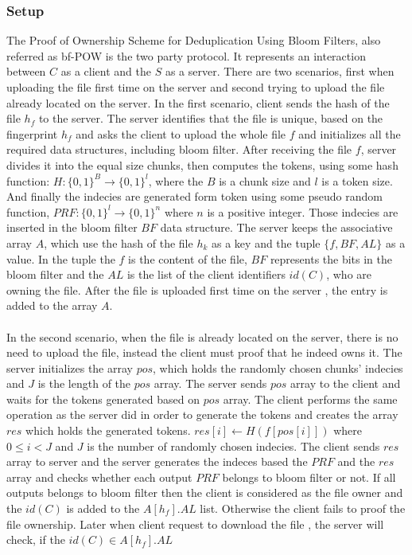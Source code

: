 \documentclass[12pt]{article}
\begin{document}
\subsubsection{Setup}
\label{subsub:setup6}
The Proof of Ownership Scheme for Deduplication Using Bloom Filters, also referred as bf-POW is the two party protocol. It represents an interaction between $C$ as a client and the $S$ as a server. There are two scenarios, first when uploading the file first time on the server and second trying to upload the file already located on the server. In the first scenario, client  sends the hash of the file  $h_f$  to the server. The server identifies that the file is unique, based on the fingerprint $h_f$ and asks the client to upload the whole file $f$ and initializes all the required data structures, including bloom filter. After receiving the file $f$, server divides it into the equal size chunks, then computes the tokens, using some hash function: $H:\{0,1\}^B\to\{0,1\}^l$, where the $B$ is a chunk size and $l$ is a token size. And finally the indecies are generated form token using some pseudo random function, $PRF: \{0,1\}^l \to \{0,1\}^{n}$ where $n$ is a positive  integer. Those indecies are inserted in the bloom filter $BF$ data structure. The server keeps the associative array $A$, which use the hash of the file $h_k$ as a key and the tuple $\{f,BF,AL\}$ as a value. In the tuple the $f$ is the content of the file, $BF$ represents the bits in the bloom filter and the $AL$ is the list of the client identifiers $id(C)$, who are owning the file. After the file is uploaded first time on the server , the entry is added to the array $A$.\\\\
In the second scenario, when the file is already located on the server, there is no need to upload the file, instead the client must proof that he indeed owns it. The server initializes the array $pos$, which holds the randomly chosen chunks' indecies and $J$ is the length of the $pos$ array. The server sends $pos$ array to the client and waits for the tokens generated based on $pos$ array. The client performs the same operation as the server did in order to generate the tokens and creates the array $res$ which holds the generated tokens.  $res[i]\gets H(f[pos[i]])$ where $ 0 \leq i < J$ and $J$ is the number of randomly chosen indecies. The client sends $res$ array to server and the server generates the indeces based the $PRF$ and the  $res$ array and checks whether each output $PRF$ belongs to bloom filter or not. If all outputs belongs to bloom filter then the client is considered as the file owner and the $id(C)$ is added to the $A[h_f].AL$ list. Otherwise the client fails to proof the file ownership. Later when client request to download the file , the server will check, if the $id(C) \in A[h_f].AL$
\end{document}

